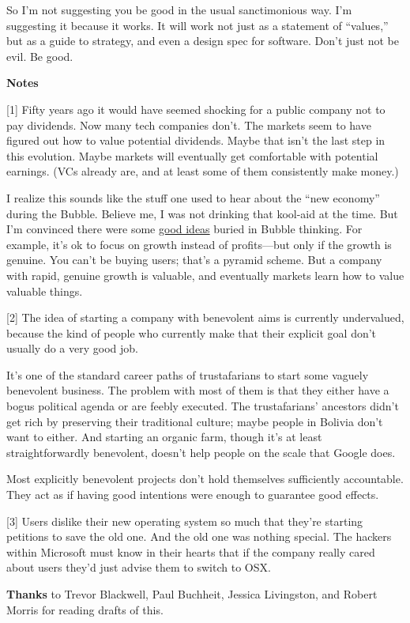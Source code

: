 So I'm not suggesting you be good in the usual sanctimonious way. I'm
suggesting it because it works. It will work not just as a statement of
``values,'' but as a guide to strategy, and even a design spec for
software. Don't just not be evil. Be good.

\textbf{Notes}

{[}1{]} Fifty years ago it would have seemed shocking for a public
company not to pay dividends. Now many tech companies don't. The markets
seem to have figured out how to value potential dividends. Maybe that
isn't the last step in this evolution. Maybe markets will eventually get
comfortable with potential earnings. (VCs already are, and at least some
of them consistently make money.)

I realize this sounds like the stuff one used to hear about the ``new
economy'' during the Bubble. Believe me, I was not drinking that
kool-aid at the time. But I'm convinced there were some
\href{bubble.html}{good ideas} buried in Bubble thinking. For example,
it's ok to focus on growth instead of profits---but only if the growth
is genuine. You can't be buying users; that's a pyramid scheme. But a
company with rapid, genuine growth is valuable, and eventually markets
learn how to value valuable things.

{[}2{]} The idea of starting a company with benevolent aims is currently
undervalued, because the kind of people who currently make that their
explicit goal don't usually do a very good job.

It's one of the standard career paths of trustafarians to start some
vaguely benevolent business. The problem with most of them is that they
either have a bogus political agenda or are feebly executed. The
trustafarians' ancestors didn't get rich by preserving their traditional
culture; maybe people in Bolivia don't want to either. And starting an
organic farm, though it's at least straightforwardly benevolent, doesn't
help people on the scale that Google does.

Most explicitly benevolent projects don't hold themselves sufficiently
accountable. They act as if having good intentions were enough to
guarantee good effects.

{[}3{]} Users dislike their new operating system so much that they're
starting petitions to save the old one. And the old one was nothing
special. The hackers within Microsoft must know in their hearts that if
the company really cared about users they'd just advise them to switch
to OSX.

\textbf{Thanks} to Trevor Blackwell, Paul Buchheit, Jessica Livingston,
and Robert Morris for reading drafts of this.
